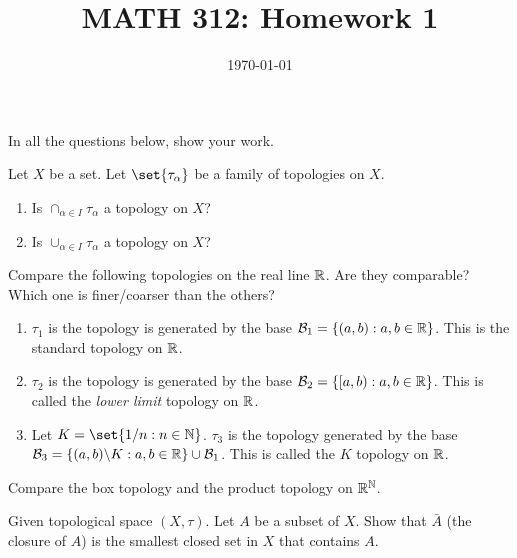 \documentclass[12pt]{amsart}
\title{ MATH 312: Homework 1 }
\author{}
\date{\today}
\begin{document}
\maketitle



\printbibliography

In all the questions below, show your work.

\begin{question}
	Let $X$ be a set.
	Let $\set{\tau_\alpha}$ be a family of topologies on $X$.
	\begin{enumerate}
		\item Is $\cap_{\alpha \in I} \tau_\alpha$ a topology on $X$?
		\item Is $\cup_{\alpha \in I} \tau_\alpha$ a topology on $X$?
	\end{enumerate}
\end{question}

\begin{question}
	Compare the following topologies on the real line $\mathbb{R}$.
	Are they comparable?
	Which one is finer/coarser than the others?

	\begin{enumerate}
		\item $\tau_1$ is the topology is generated by the base $\mathcal{B}_1 = \left\{ (a,b): a,b \in \mathbb{R}  \right\}$.
		      This is the standard topology on $\mathbb{R}$.
		\item $\tau_2$ is the topology is generated by the base $\mathcal{B}_2 = \left\{ [a,b): a,b \in \mathbb{R}  \right\}$.
		      This is called the \emph{lower limit} topology on $\mathbb{R}$.
		\item Let $K = \set{ 1/n : n\in \N}$. $\tau_3$ is the topology generated by the base
		      $\mathcal{B}_3 = \left\{ (a,b) \backslash K : a,b \in \mathbb{R}  \right\} \cup \mathcal{B}_1 $.
		      This is called the $K$ topology on $\mathbb{R}$.
	\end{enumerate}
\end{question}



\begin{question}
	Compare the box topology and the product topology on $\mathbb{R}^{\mathbb{N}}$.
\end{question}


\begin{question}
	Given topological space $(X, \tau)$.
	Let $A$ be a subset of $X$.
	Show that $\bar A$ (the closure of $A$) is the smallest closed set in $X$
	that contains $A$.
\end{question}
\end{document}
